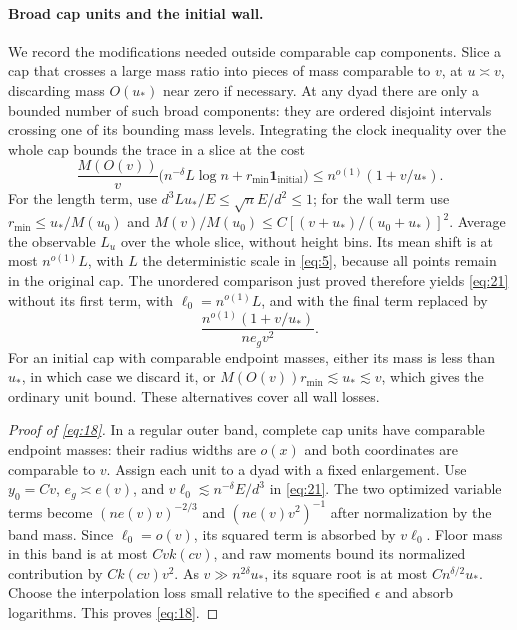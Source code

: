 \paragraph{Broad cap units and the initial wall.}
We record the modifications needed outside comparable cap components.
Slice a cap that crosses a large mass ratio into pieces of mass
comparable to $v$, at $u\asymp v$, discarding mass $O(u_*)$ near zero
if necessary.  At any dyad there are only a bounded number of such
broad components: they are ordered disjoint intervals crossing one
of its bounding mass levels.  Integrating the clock inequality over
the whole cap bounds the trace in a slice at the cost
\[
 \frac{M(O(v))}{v}
       \bigl(n^{-\delta}L\log n
                       +r_{\min}\mathbf1_{\mathrm{initial}}\bigr)
 \le n^{o(1)}(1+v/u_*).
\]
For the length term, use
$d^3Lu_*/E\le\sqrt n E/d^2\le1$; for the wall term use
$r_{\min}\le u_*/M(u_0)$ and
$M(v)/M(u_0)\le C[(v+u_*)/(u_0+u_*)]^2$.
Average the observable $L_u$ over the whole slice, without height bins.
Its mean shift is at most $n^{o(1)}L$, with $L$ the deterministic scale
in \eqref{eq:5}, because all points remain in the original cap.
The unordered comparison just proved therefore yields
\eqref{eq:21} without its first term, with $\ell_0=n^{o(1)}L$, and
with the final term replaced by
\[
 \frac{n^{o(1)}(1+v/u_*)}{ne_gv^2}.
\]
For an initial cap with comparable endpoint masses, either its mass
is less than $u_*$, in which case we discard it, or
$M(O(v))r_{\min}\lesssim u_*\lesssim v$, which gives the ordinary
unit bound.  These alternatives cover all wall losses.

\begin{proof}[Proof of \eqref{eq:18}]
In a regular outer band, complete cap units have comparable endpoint
masses: their radius widths are $o(x)$ and both coordinates are
comparable to $v$.  Assign each unit to a dyad with a fixed enlargement.
Use $y_0=Cv$, $e_g\asymp e(v)$, and
$v\ell_0\lesssim n^{-\delta}E/d^3$ in \eqref{eq:21}.
The two optimized variable terms become
$(ne(v)v)^{-2/3}$ and $(ne(v)v^2)^{-1}$ after normalization by the
band mass.  Since $\ell_0=o(v)$, its squared term is absorbed by
$v\ell_0$.  Floor mass in this band is at most $Cv k(cv)$, and raw
moments bound its normalized contribution by $Ck(cv)v^2$.
As $v\gg n^{2\delta}u_*$, its square root is at most
$Cn^{\delta/2}u_*$.  Choose the interpolation loss small relative to
the specified $\epsilon$ and absorb logarithms.  This proves
\eqref{eq:18}.
\end{proof}

